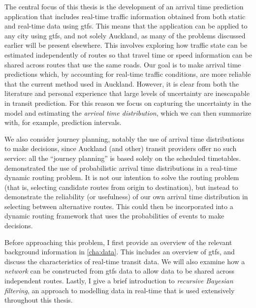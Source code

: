 The central focus of this thesis is the development of an arrival time prediction application that includes real-time traffic information obtained from both static and real-time data using \gls{gtfs}. This means that the application can be applied to any city using \gls{gtfs}, and not solely Auckland, as many of the problems discussed earlier will be present elsewhere. This involves exploring how traffic state can be estimated independently of routes so that travel time or speed information can be shared across routes that use the same roads. Our goal is to make arrival time predictions which, by accounting for real-time traffic conditions, are more reliable that the current method used in Auckland. However, it is clear from both the literature and personal experience that large levels of uncertainty are inescapable in transit prediction. For this reason we focus on capturing the uncertainty in the model and estimating the \emph{arrival time distribution}, which we can then summarize with, for example, prediction intervals.


We also consider journey planning, notably the use of arrival time distributions to make decisions, since Auckland (and other) transit providers offer no such service: all the ``journey planning'' is based solely on the scheduled timetables.  demonstrated the use of probabilistic arrival time distributions in a real-time dynamic routing problem. It is not our intention to solve the routing problem (that is, selecting candidate routes from origin to destination), but instead to demonstrate the reliability (or usefulness) of our own arrival time distribution in selecting between alternative routes. This could then be incorporated into a dynamic routing framework that uses the probabilities of events to make decisions.


Before approaching this problem, I first provide an overview of the relevant background information in \cref{cha:data}. This includes an overview of \gls{gtfs}, and discuss the characteristics of real-time transit data. We will also examine how a \emph{network} can be constructed from \gls{gtfs} data to allow data to be shared across independent routes. Lastly, I give a brief introduction to \emph{recursive Bayesian filtering}, an approach to modelling data in real-time that is used extensively throughout this thesis.


